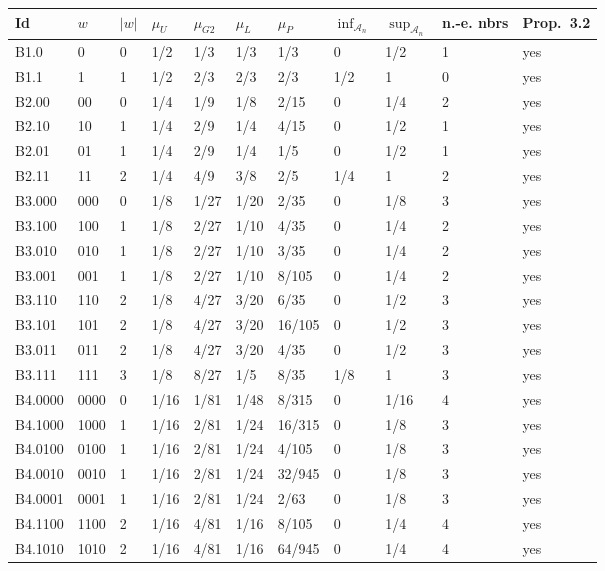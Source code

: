 {\scriptsize\setlength{\tabcolsep}{3pt}
\begin{longtable}{@{}lllllllllll@{}}
\toprule
Id & $w$ & $|w|$ & $\mu_{U}$ & $\mu_{G2}$ & $\mu_{L}$ & $\mu_{P}$ & $\inf_{\mathcal{A}_n}$ & $\sup_{\mathcal{A}_n}$ & n.-e. nbrs & Prop.~3.2 \\
\midrule\endhead
\bottomrule\endfoot
B1.0 & 0 & 0 & 1/2 & 1/3 & 1/3 & 1/3 & 0 & 1/2 & 1 & yes \\
B1.1 & 1 & 1 & 1/2 & 2/3 & 2/3 & 2/3 & 1/2 & 1 & 0 & yes \\
\midrule
B2.00 & 00 & 0 & 1/4 & 1/9 & 1/8 & 2/15 & 0 & 1/4 & 2 & yes \\
B2.10 & 10 & 1 & 1/4 & 2/9 & 1/4 & 4/15 & 0 & 1/2 & 1 & yes \\
B2.01 & 01 & 1 & 1/4 & 2/9 & 1/4 & 1/5 & 0 & 1/2 & 1 & yes \\
B2.11 & 11 & 2 & 1/4 & 4/9 & 3/8 & 2/5 & 1/4 & 1 & 2 & yes \\
\midrule
B3.000 & 000 & 0 & 1/8 & 1/27 & 1/20 & 2/35 & 0 & 1/8 & 3 & yes \\
B3.100 & 100 & 1 & 1/8 & 2/27 & 1/10 & 4/35 & 0 & 1/4 & 2 & yes \\
B3.010 & 010 & 1 & 1/8 & 2/27 & 1/10 & 3/35 & 0 & 1/4 & 2 & yes \\
B3.001 & 001 & 1 & 1/8 & 2/27 & 1/10 & 8/105 & 0 & 1/4 & 2 & yes \\
B3.110 & 110 & 2 & 1/8 & 4/27 & 3/20 & 6/35 & 0 & 1/2 & 3 & yes \\
B3.101 & 101 & 2 & 1/8 & 4/27 & 3/20 & 16/105 & 0 & 1/2 & 3 & yes \\
B3.011 & 011 & 2 & 1/8 & 4/27 & 3/20 & 4/35 & 0 & 1/2 & 3 & yes \\
B3.111 & 111 & 3 & 1/8 & 8/27 & 1/5 & 8/35 & 1/8 & 1 & 3 & yes \\
\midrule
B4.0000 & 0000 & 0 & 1/16 & 1/81 & 1/48 & 8/315 & 0 & 1/16 & 4 & yes \\
B4.1000 & 1000 & 1 & 1/16 & 2/81 & 1/24 & 16/315 & 0 & 1/8 & 3 & yes \\
B4.0100 & 0100 & 1 & 1/16 & 2/81 & 1/24 & 4/105 & 0 & 1/8 & 3 & yes \\
B4.0010 & 0010 & 1 & 1/16 & 2/81 & 1/24 & 32/945 & 0 & 1/8 & 3 & yes \\
B4.0001 & 0001 & 1 & 1/16 & 2/81 & 1/24 & 2/63 & 0 & 1/8 & 3 & yes \\
B4.1100 & 1100 & 2 & 1/16 & 4/81 & 1/16 & 8/105 & 0 & 1/4 & 4 & yes \\
B4.1010 & 1010 & 2 & 1/16 & 4/81 & 1/16 & 64/945 & 0 & 1/4 & 4 & yes \\

\end{longtable}}
